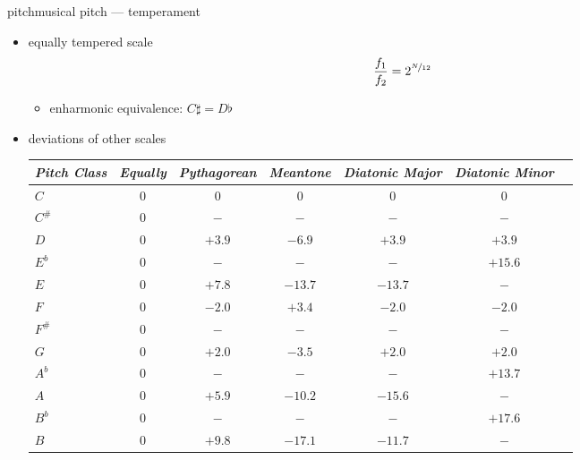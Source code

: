         \begin{frame}{pitch}{musical pitch --- temperament}
            \begin{itemize}
                \item	equally tempered scale
                    \begin{equation*}
                        \frac{f_1}{f_2} = 2^{\nicefrac{N}{12}} 
                    \end{equation*}
                    \begin{itemize}
                        \item<2->	enharmonic equivalence: $C\sharp = D\flat$
                    \end{itemize}

                \item<3->	deviations of other scales
                    \begin{tiny}\begin{table}
                        \centering
                        \begin{tabular}{lcccccc} %
                            \\ \hline
                            \bf{\emph{Pitch Class}}	 & \bf{\emph{Equally}}	 & \bf{\emph{Pythagorean}}	 & \bf{\emph{Meantone}}	 & \bf{\emph{Diatonic Major}}	 & \bf{\emph{Diatonic Minor}}\\ 
                             \hline
                            \bf{$C$}	 & $0$	 & $0$	 & $0$	 & $0$	 & $0$\\
                            \bf{$C^\#$}	 & $0$	 & $-$	 & $-$	 & $-$	 & $-$\\
                            \bf{$D$}	 & $0$	 & $+3.9$	 & $-6.9$	 & $+3.9$	 & $+3.9$\\
                            \bf{$E^b$}	 & $0$	 & $-$	 & $-$	 & $-$	 & $+15.6$\\
                            \bf{$E$}	 & $0$	 & $+7.8$	 & $-13.7$	 & $-13.7$	 & $-$\\
                            \bf{$F$}	 & $0$	 & $-2.0$	 & $+3.4$	 & $-2.0$	 & $-2.0$\\
                            \bf{$F^\#$}	 & $0$	 & $-$	 & $-$	 & $-$	 & $-$\\
                            \bf{$G$}	 & $0$	 & $+2.0$	 & $-3.5$	 & $+2.0$	 & $+2.0$\\
                            \bf{$A^b$}	 & $0$	 & $-$	 & $-$	 & $-$	 & $+13.7$\\
                            \bf{$A$}	 & $0$	 & $+5.9$	 & $-10.2$	 & $-15.6$	 & $-$\\
                            \bf{$B^b$}	 & $0$	 & $-$	 & $-$ 	 & $-$	 & $+17.6$\\
                            \bf{$B$}	 & $0$	 & $+9.8$	 & $-17.1$	 & $-11.7$	 & $-$\\
                        \end{tabular}
                    \end{table}\end{tiny}			
            \end{itemize}
        \end{frame}
        
